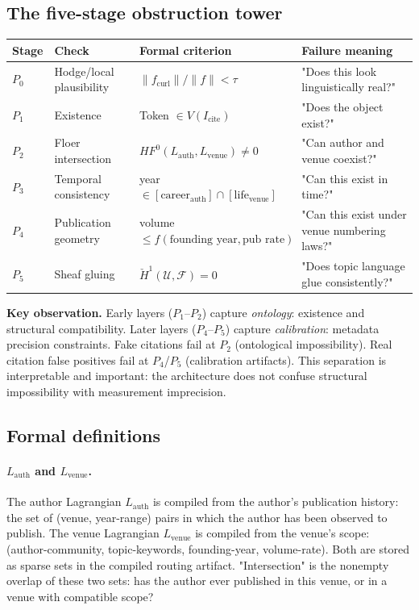 \documentclass[11pt,a4paper]{article}
\begin{document}
\subsection{The five-stage obstruction tower}

\begin{center}
\renewcommand{\arraystretch}{1.3}\small
\begin{tabularx}{\linewidth}{p{1.2cm}p{2.5cm}p{4cm}X}
\toprule
\textbf{Stage} & \textbf{Check} & \textbf{Formal criterion} &
\textbf{Failure meaning} \\
\midrule
$P_0$ & Hodge/local plausibility &
  $\|f_\text{curl}\| / \|f\| < \tau$ &
  "Does this look linguistically real?" \\
$P_1$ & Existence &
  Token $\in V(I_\text{cite})$ &
  "Does the object exist?" \\
$P_2$ & Floer intersection &
  $HF^0(L_\text{auth}, L_\text{venue}) \neq 0$ &
  "Can author and venue coexist?" \\
$P_3$ & Temporal consistency &
  year $\in [\text{career}_\text{auth}] \cap [\text{life}_\text{venue}]$ &
  "Can this exist in time?" \\
$P_4$ & Publication geometry &
  volume $\leq f(\text{founding year}, \text{pub rate})$ &
  "Can this exist under venue numbering laws?" \\
$P_5$ & Sheaf gluing &
  $\check{H}^1(\mathcal{U}, \mathcal{F}) = 0$ &
  "Does topic language glue consistently?" \\
\bottomrule
\end{tabularx}
\end{center}

\noindent\textbf{Key observation.}
Early layers ($P_1$--$P_2$) capture \emph{ontology}: existence and
structural compatibility.
Later layers ($P_4$--$P_5$) capture \emph{calibration}: metadata
precision constraints.
Fake citations fail at $P_2$ (ontological impossibility).
Real citation false positives fail at $P_4$/$P_5$ (calibration
artifacts).
This separation is interpretable and important:
the architecture does not confuse structural impossibility with
measurement imprecision.

\subsection{Formal definitions}

\paragraph{$L_\text{auth}$ and $L_\text{venue}$.}
The author Lagrangian $L_\text{auth}$ is compiled from the author's
publication history: the set of (venue, year-range) pairs in which
the author has been observed to publish.
The venue Lagrangian $L_\text{venue}$ is compiled from the venue's
scope: (author-community, topic-keywords, founding-year, volume-rate).
Both are stored as sparse sets in the compiled routing artifact.
"Intersection" is the nonempty overlap of these two sets: has the
author ever published in this venue, or in a venue with compatible
scope?
\end{document}
